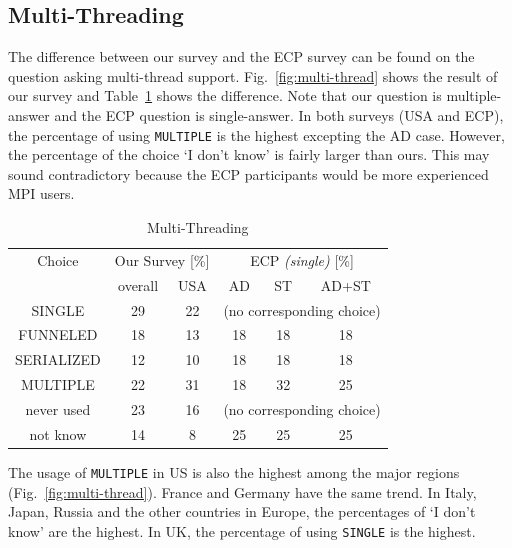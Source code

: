 \documentclass[conference,10pt,letterpaper]{IEEEtran}
\def\myquote#1{`#1'}
\begin{document}
\subsection{Multi-Threading}

The difference between our survey and the ECP survey can be found on
the question asking multi-thread support. Fig.~\ref{fig:multi-thread}
shows the result of our survey and Table~\ref{tab:multi-thread} shows
the difference. Note that our question is multiple-answer and the ECP
question is single-answer. In both surveys (USA and ECP), the
percentage of using {\tt MULTIPLE} is the highest excepting the AD
case. However, the percentage of the choice \myquote{I don't know}
is fairly larger than ours. This may sound contradictory because the
ECP participants would be more experienced MPI users.

\begin{table}[htb]%
\begin{center}%
\caption{Multi-Threading}\label{tab:multi-thread}%
\begin{tabular}{c||c|c||c|c|c}%
\hline%
Choice & \multicolumn{2}{c||}{Our Survey [\%]} & 
\multicolumn{3}{c}{ECP {\it(single)} [\%]} \\
\cline{2-6}%
 & overall & USA & AD & ST & AD+ST \\
\hline%
SINGLE & 29 & 22 & \multicolumn{3}{c}{\tiny (no corresponding choice)} \\
FUNNELED & 18 & 13 & 18 & 18 & 18 \\
SERIALIZED & 12 & 10 & 18 & 18 & 18 \\
MULTIPLE & 22 & 31 & 18 & 32 & 25 \\
never used & 23 & 16 & \multicolumn{3}{c}{\tiny (no corresponding choice)} \\
not know & 14 & 8 & 25 & 25 & 25\\
\hline%
\end{tabular}%
\end{center}%
\end{table}%

The usage of {\tt MULTIPLE} in US is also the highest among the major
regions (Fig.~\ref{fig:multi-thread}). France and Germany have the
same trend. In Italy, Japan, Russia and the
other countries in Europe, the percentages of \myquote{I don't know}
are the highest. In UK, the percentage of using {\tt SINGLE} is the
highest.
\end{document}
